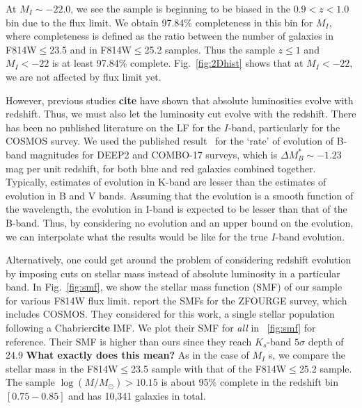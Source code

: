 \documentclass[twocolumn,useAMS,usenatbib]{mn2e}
\begin{document}
At $M_I\sim-22.0$, we see the sample is beginning to be biased in the $0.9<z<1.0$ bin due to the flux limit. We obtain 97.84\% completeness in this bin for $M_I$, where completeness is defined as the ratio between the number of galaxies in F814W$\le$23.5 and in F814W$\le$25.2 samples.
Thus the sample $z\le1$ and $M_I<-22$ is at least 97.84\% complete. Fig.~\ref{fig:2Dhist} shows that at $M_I<-22$, we are not affected by flux limit yet. 

However, previous studies {\bf cite} have shown that absolute luminosities evolve with redshift. Thus, we must also let the luminosity cut evolve with the redshift. 
There has been no published literature on the LF for the $I$-band, particularly for the COSMOS survey.
We used the published result~\citep{Faber2007} for the `rate' of evolution of B-band magnitudes for DEEP2 and COMBO-17 surveys, which is $ \Delta M_B^* \sim -1.23$ mag per unit redshift, for both blue and red galaxies combined together.
Typically, estimates of evolution in K-band are lesser than the estimates of evolution in B and V bands.
Assuming that the evolution is a smooth function of the wavelength, the evolution in I-band is expected to be lesser than that of the B-band. 
Thus, by considering no evolution and an upper bound on the evolution, we can interpolate what the results would be like for the true $I$-band evolution.



Alternatively, one could get around the problem of considering redshift evolution by imposing cuts on stellar mass instead of absolute luminosity in a particular band. In Fig.~\ref{fig:smf}, we show the stellar mass function (SMF) of our sample for various F814W flux limit.
\cite{Tomczak_SMF} report the SMFs for the ZFOURGE survey, which includes COSMOS. They considered for this work, a single stellar population following a Chabrier{\bf cite} IMF. 
We plot their SMF for \emph{all} in ~\ref{fig:smf} for reference. Their SMF is higher than ours since they reach $K_s$-band $5\sigma$ depth of 24.9 {\bf What exactly does this mean?}
As in the case of $M_I$ s, we compare the stellar mass in the F814W$\le$23.5 sample with that of the F814W$\le$25.2 sample. 
The sample $\log(M/M_\odot) > 10.15$ is about 95\% complete in the redshift bin $\left[ 0.75 - 0.85\right]$ and has 10,341 galaxies in total.
\end{document}
